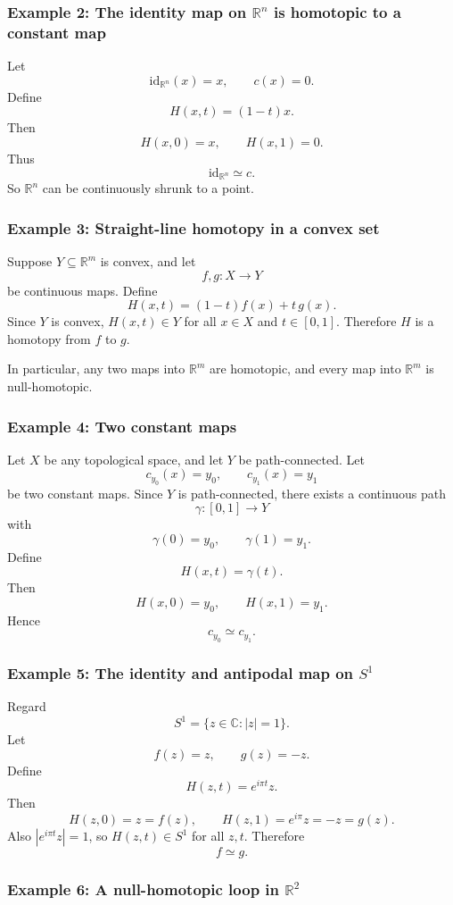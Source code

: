 \documentclass[12pt,a4paper]{article}
\theoremstyle{notespace}
\begin{document}
\subsubsection{Example 2: The identity map on \(\mathbb R^n\) is homotopic to a constant map}

Let
\[
\mathrm{id}_{\mathbb R^n}(x)=x,
\qquad
c(x)=0.
\]
Define
\[
H(x,t)=(1-t)x.
\]
Then
\[
H(x,0)=x,
\qquad
H(x,1)=0.
\]
Thus
\[
\mathrm{id}_{\mathbb R^n}\simeq c.
\]
So \(\mathbb R^n\) can be continuously shrunk to a point.

\subsubsection{Example 3: Straight-line homotopy in a convex set}

Suppose \(Y\subseteq \mathbb R^m\) is convex, and let
\[
f,g:X\to Y
\]
be continuous maps. Define
\[
H(x,t)=(1-t)f(x)+t\,g(x).
\]
Since \(Y\) is convex, \(H(x,t)\in Y\) for all \(x\in X\) and \(t\in[0,1]\). Therefore \(H\) is a homotopy from \(f\) to \(g\).

In particular, any two maps into \(\mathbb R^m\) are homotopic, and every map into \(\mathbb R^m\) is null-homotopic.

\subsubsection{Example 4: Two constant maps}

Let \(X\) be any topological space, and let \(Y\) be path-connected. Let
\[
c_{y_0}(x)=y_0,
\qquad
c_{y_1}(x)=y_1
\]
be two constant maps. Since \(Y\) is path-connected, there exists a continuous path
\[
\gamma:[0,1]\to Y
\]
with
\[
\gamma(0)=y_0,
\qquad
\gamma(1)=y_1.
\]
Define
\[
H(x,t)=\gamma(t).
\]
Then
\[
H(x,0)=y_0,
\qquad
H(x,1)=y_1.
\]
Hence
\[
c_{y_0}\simeq c_{y_1}.
\]

\subsubsection{Example 5: The identity and antipodal map on \(S^1\)}

Regard
\[
S^1=\{z\in\mathbb C:|z|=1\}.
\]
Let
\[
f(z)=z,
\qquad
g(z)=-z.
\]
Define
\[
H(z,t)=e^{i\pi t}z.
\]
Then
\[
H(z,0)=z=f(z),
\qquad
H(z,1)=e^{i\pi}z=-z=g(z).
\]
Also \(|e^{i\pi t}z|=1\), so \(H(z,t)\in S^1\) for all \(z,t\). Therefore
\[
f\simeq g.
\]

\subsubsection{Example 6: A null-homotopic loop in \(\mathbb R^2\)}
\end{document}

